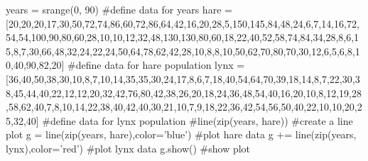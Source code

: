 \documentclass{ximera}
\begin{document}
\begin{sageCell}
years = srange(0, 90)  #define data for years
hare = [20,20,20,17,30,50,72,74,86,60,72,86,64,42,16,20,28,5,150,145,84,48,24,6,7,14,16,72,54,54,100,90,80,60,28,10,10,12,32,48,130,130,80,60,18,22,40,52,58,74,84,34,28,8,6,15,8,7,30,66,48,32,24,22,24,50,64,78,62,42,28,10,8,8,10,50,62,70,80,70,30,12,6,5,6,8,10,40,90,82,20]   #define data for hare population
lynx = [36,40,50,38,30,10,8,7,10,14,35,35,30,24,17,8,6,7,18,40,54,64,70,39,18,14,8,7,22,30,38,45,44,40,22,12,12,20,32,42,76,80,42,38,26,20,18,24,36,48,54,40,16,20,10,8,12,19,28,58,62,40,7,8,10,14,22,38,40,42,40,30,21,10,7,9,18,22,36,42,54,56,50,40,22,10,10,20,25,32,40]    #define data for lynx population
#line(zip(years, hare))    #create a line plot
g = line(zip(years, hare),color='blue')   #plot hare data
g += line(zip(years, lynx),color='red')   #plot lynx data
g.show()   #show plot
\end{sageCell}
\end{document}
